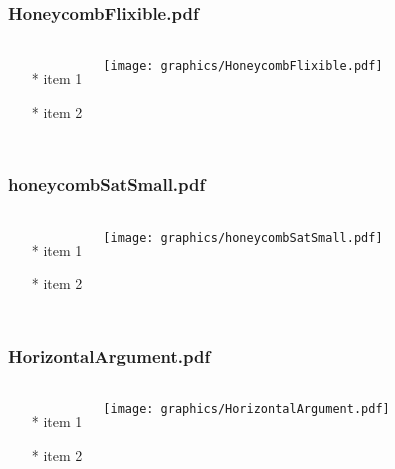 \begin{frame} \frametitle{HoneycombFlixible.pdf}
    \begin{columns}[c]
        \begin{itemize}
            \item[*] item 1
            \item[*] item 2
        \end{itemize}
        \begin{minipage}{\linewidth}
            \begin{center}
            \texttt{[image: graphics/HoneycombFlixible.pdf]}
            \label{gfx:HoneycombFlixible.pdf}
            \end{center}
        \end{minipage}
    \end{columns}
\end{frame}
\begin{frame} \frametitle{honeycombSatSmall.pdf}
    \begin{columns}[c]
        \begin{itemize}
            \item[*] item 1
            \item[*] item 2
        \end{itemize}
        \begin{minipage}{\linewidth}
            \begin{center}
            \texttt{[image: graphics/honeycombSatSmall.pdf]}
            \label{gfx:honeycombSatSmall.pdf}
            \end{center}
        \end{minipage}
    \end{columns}
\end{frame}
\begin{frame} \frametitle{HorizontalArgument.pdf}
    \begin{columns}[c]
        \begin{itemize}
            \item[*] item 1
            \item[*] item 2
        \end{itemize}
        \begin{minipage}{\linewidth}
            \begin{center}
            \texttt{[image: graphics/HorizontalArgument.pdf]}
            \label{gfx:HorizontalArgument.pdf}
            \end{center}
        \end{minipage}
    \end{columns}
\end{frame}
